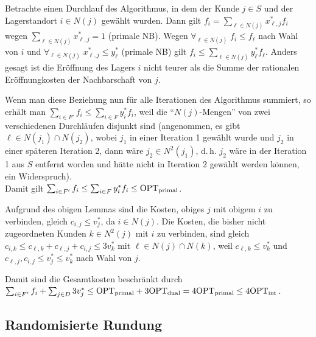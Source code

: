 \begin{Beweis}
    Betrachte einen Durchlauf des Algorithmus, in dem der Kunde $j \in S$ und
    der Lagerstandort $i \in N(j)$ gewählt wurden.
    Dann gilt
    $f_i = \sum_{\ell \in N(j)} x_{\ell,j}^\ast f_i$ wegen
    $\sum_{\ell \in N(j)} x_{\ell,j}^\ast = 1$ (primale NB).
    Wegen $\forall_{\ell \in N(j)}\; f_i \le f_\ell$ nach Wahl von $i$ und
    $\forall_{\ell \in N(j)}\; x_{\ell,j}^\ast \le y_\ell^\ast$ (primale NB) gilt
    $f_i \le \sum_{\ell \in N(j)} y_\ell^\ast f_\ell$.
    Anders gesagt ist die Eröffnung des Lagers $i$ nicht teurer als die
    Summe der rationalen Eröffnungkosten der Nachbarschaft von $j$.

    Wenn man diese Beziehung nun für alle Iterationen des Algorithmus summiert,
    so erhält man $\sum_{i \in F'} f_i \le \sum_{i \in F} y_i^\ast f_i$,
    weil die "`$N(j)$-Mengen"' von zwei verschiedenen Durchläufen disjunkt sind
    (angenommen, es gibt $\ell \in N(j_1) \cap N(j_2)$,
    wobei $j_1$ in einer Iteration 1 gewählt wurde und $j_2$ in einer späteren Iteration 2,
    dann wäre $j_2 \in N^2(j_1)$, d.\,h. $j_2$ wäre in der Iteration 1 aus $S$ entfernt worden
    und hätte nicht in Iteration 2 gewählt werden können, ein Widerspruch).\\
    Damit gilt $\sum_{i \in F'} f_i \le \sum_{i \in F} y_i^\ast f_i \le \text{OPT}_\text{primal}$.

    Aufgrund des obigen Lemmas sind die Kosten, obiges $j$ mit obigem $i$ zu verbinden,
    gleich $c_{i,j} \le v_j^\ast$, da $i \in N(j)$.
    Die Kosten, die bisher nicht zugeordneten Kunden $k \in N^2(j)$ mit $i$ zu verbinden,
    sind gleich $c_{i,k} \le c_{\ell,k} + c_{\ell,j} + c_{i,j} \le 3v_k^\ast$
    mit $\ell \in N(j) \cap N(k)$, weil $c_{\ell,k} \le v_k^\ast$ und
    $c_{\ell,j}, c_{i,j} \le v_j^\ast \le v_k^\ast$ nach Wahl von $j$.

    Damit sind die Gesamtkosten beschränkt durch\\
    $\sum_{i \in F'} f_i + \sum_{j \in D} 3v_j^\ast
    \le \text{OPT}_\text{primal} + 3\text{OPT}_\text{dual} = 4\text{OPT}_\text{primal} \le 4\text{OPT}_\text{int}$.
\end{Beweis}

\pagebreak

\subsection{%
    Randomisierte Rundung%
}

